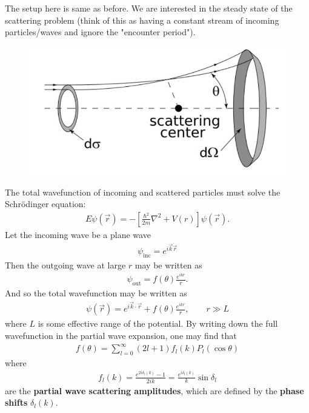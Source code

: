 \documentclass{book}
\theoremstyle{definition}
\newcommand{\f}[2]{\frac{#1}{#2}}
\newcommand{\lb}{\left[}
\newcommand{\rb}{\right]}
\begin{document}
The setup here is same as before. We are interested in the steady state of the scattering problem (think of this as having a constant stream of incoming particles/waves and ignore the "encounter period").
\begin{figure}[!htb]
	\centering
	\includegraphics[scale=0.4]{figures/scat_center.png}
\end{figure}
The total wavefunction of incoming and scattered particles must solve the Schr\"{o}dinger equation:
\begin{align*}
	E\psi(\vec{r}) = -\lb \f{\hbar^2}{2m}\nabla^2 + V(r)\rb \psi(\vec{r}). 
\end{align*}
Let the incoming wave be a plane wave 
\begin{align*}
	\psi_\text{inc} = e^{i\vec{k}\dot \vec{r}}
\end{align*}
Then the outgoing wave at large $r$ may be written as 
\begin{align*}
	\psi_\text{out} = f(\theta) \f{e^{ikr}}{r}.
\end{align*}
And so the total wavefunction may be written as
\begin{align*}
	\boxed{\psi(\vec{r}) = e^{i\vec{k}\cdot \vec{r}} + f(\theta) \f{e^{ikr}}{r}, \quad\quad r \gg L} 
\end{align*}
where $L$ is some effective range of the potential. By writing down the full wavefunction in the partial wave expansion, one may find that
\begin{align*}
	f(\theta) = \sum_{l=0}^\infty (2l+1) f_l(k) P_l(\cos\theta)
\end{align*}
where
\begin{align*}
	f_l(k) = \f{e^{2i\delta_l(k)} - 1}{2ik} = \f{e^{i\delta_l(k)}}{k} \sin\delta_l
\end{align*}
are the \textbf{partial wave scattering amplitudes}, which are defined by the \textbf{phase shifts} $\delta_l(k)$. \\
\end{document}

